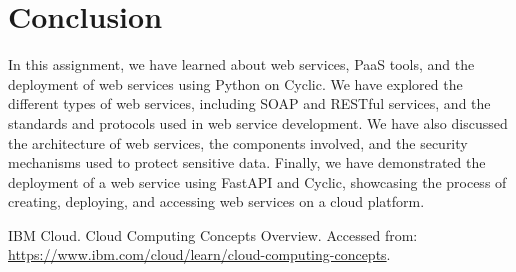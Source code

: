 \documentclass[11pt]{article}
\begin{document}
\section{Conclusion}

In this assignment, we have learned about web services, PaaS tools, and the deployment of web services using Python on Cyclic. We have explored the different types of web services, including SOAP and RESTful services, and the standards and protocols used in web service development. We have also discussed the architecture of web services, the components involved, and the security mechanisms used to protect sensitive data. Finally, we have demonstrated the deployment of a web service using FastAPI and Cyclic, showcasing the process of creating, deploying, and accessing web services on a cloud platform.
\clearpage

\pagebreak
\begin{thebibliography}{}

    IBM Cloud. Cloud Computing Concepts Overview. Accessed from: \url{https://www.ibm.com/cloud/learn/cloud-computing-concepts}.

\end{thebibliography}
\end{document}
